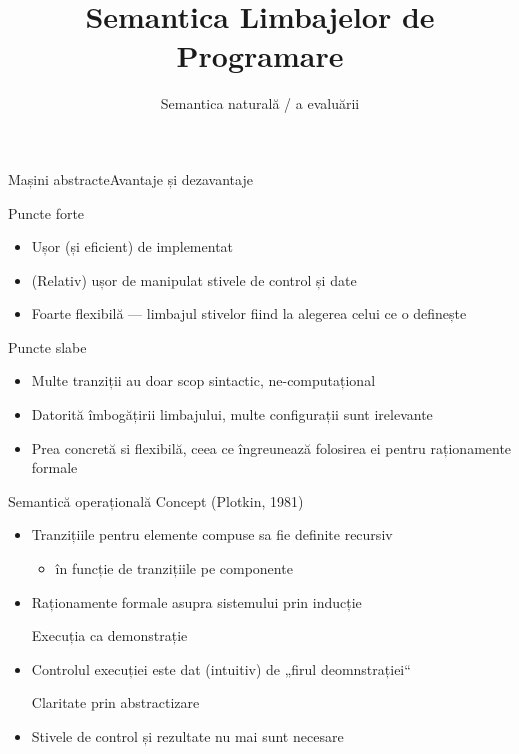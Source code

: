 \documentclass[xcolor=pdftex,romanian,colorlinks]{beamer}
\title[SLP---Semantica evaluării]{Semantica Limbajelor de Programare}
\subtitle{Semantica naturală / a evaluării}
\begin{document}
\maketitle


\begin{frame}{Mașini abstracte}{Avantaje și dezavantaje}
\begin{block}{Puncte forte}
\begin{itemize}
\item Ușor (și eficient) de implementat
\item (Relativ) ușor de manipulat stivele de control și date
\item Foarte flexibilă --- limbajul stivelor fiind la alegerea celui ce o definește
\end{itemize}
\end{block}
\vfill
\begin{block}{Puncte slabe}
\begin{itemize}
\item Multe tranziții au doar scop sintactic, ne-computațional
\item Datorită îmbogățirii limbajului, multe configurații sunt irelevante 
\item Prea concretă si flexibilă, ceea ce îngreunează folosirea ei pentru raționamente formale
\end{itemize}
\end{block}
\end{frame}

\begin{frame}{Semantică operațională }
{Concept (Plotkin, 1981) }

\begin{itemize}
\vitem Definiția sistemului de tranziție trebuie să reflecte structura limbajului
\item Tranzițiile pentru elemente compuse sa fie definite recursiv 
\begin{itemize}
\item în funcție de tranzițiile pe componente
\end{itemize}
\item Raționamente formale asupra sistemului prin inducție


\vitem Execuția ca demonstrație 
\item Controlul execuției este dat (intuitiv) de „firul deomnstrației“

\vitem Claritate prin abstractizare
\item Stivele de control și rezultate nu mai sunt necesare
\end{itemize}
\end{frame}
\end{document}
